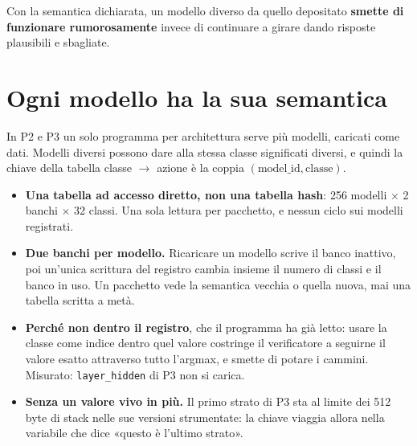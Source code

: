 \documentclass[11pt,a4paper,oneside]{report}
\begin{document}
\begin{lezione}
Con la semantica dichiarata, un modello diverso da quello depositato
\textbf{smette di funzionare rumorosamente} invece di continuare a girare dando
risposte plausibili e sbagliate.
\end{lezione}

\section{Ogni modello ha la sua semantica}

In P2 e P3 un solo programma per architettura serve più modelli, caricati come
dati. Modelli diversi possono dare alla stessa classe significati diversi, e
quindi la chiave della tabella classe $\to$ azione è la coppia
$(\text{model\_id}, \text{classe})$.

\begin{center}
\end{center}

\begin{itemize}
\item \textbf{Una tabella ad accesso diretto, non una tabella hash}: 256 modelli
      $\times$ 2 banchi $\times$ 32 classi. Una sola lettura per pacchetto, e
      nessun ciclo sui modelli registrati.
\item \textbf{Due banchi per modello.} Ricaricare un modello scrive il banco
      inattivo, poi un'unica scrittura del registro cambia insieme il numero di
      classi e il banco in uso. Un pacchetto vede la semantica vecchia o quella
      nuova, mai una tabella scritta a metà.
\item \textbf{Perché non dentro il registro}, che il programma ha già letto: usare
      la classe come indice dentro quel valore costringe il verificatore a
      seguirne il valore esatto attraverso tutto l'argmax, e smette di potare i
      cammini. Misurato: \texttt{layer\_hidden} di P3 non si carica.
\item \textbf{Senza un valore vivo in più.} Il primo strato di P3 sta al
      limite dei 512 byte di stack nelle sue versioni strumentate: la chiave
      viaggia allora nella variabile che dice «questo è l'ultimo strato».
\end{itemize}
\end{document}
